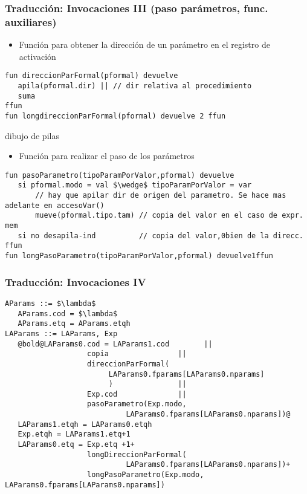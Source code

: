 \documentclass[hyperref={pdfpagelabels=false},tree-dvips,compress]{beamer}
\begin{document}
\begin{frame}[fragile]
\frametitle{Traducción: Invocaciones III (paso parámetros, func. auxiliares)}

\begin{itemize}
	\item Función para obtener la dirección de un parámetro en el registro de activación
\end{itemize}

\begin{lstlisting}[style=codigoMP,basicstyle=\scriptsize\ttfamily,mathescape]
fun direccionParFormal(pformal) devuelve
   apila(pformal.dir) || // dir relativa al procedimiento
   suma
ffun
fun longdireccionParFormal(pformal) devuelve 2 ffun
\end{lstlisting}

dibujo de pilas

\begin{itemize}
	\item Función para realizar el paso de los parámetros
\end{itemize}

\begin{lstlisting}[style=codigoMP,basicstyle=\scriptsize\ttfamily,mathescape]
fun pasoParametro(tipoParamPorValor,pformal) devuelve
   si pformal.modo = val $\wedge$ tipoParamPorValor = var
       // hay que apilar dir de origen del parametro. Se hace mas adelante en accesoVar()
       mueve(pformal.tipo.tam) // copia del valor en el caso de expr. mem
   si no desapila-ind          // copia del valor,0bien de la direcc.
ffun
fun longPasoParametro(tipoParamPorValor,pformal) devuelve1ffun
\end{lstlisting}

\end{frame}
\begin{frame}[fragile]
\frametitle{Traducción: Invocaciones IV}


\begin{lstlisting}[style=gramaticas,basicstyle=\scriptsize\ttfamily,mathescape]
AParams ::= $\lambda$
   AParams.cod = $\lambda$
   AParams.etq = AParams.etqh
LAParams ::= LAParams, Exp
   @bold@LAParams0.cod = LAParams1.cod        ||
                   copia                ||
                   direccionParFormal(
                   	    LAParams0.fparams[LAParams0.nparams]
                   	    )               ||
                   Exp.cod              ||
                   pasoParametro(Exp.modo,
                            LAParams0.fparams[LAParams0.nparams])@
   LAParams1.etqh = LAParams0.etqh
   Exp.etqh = LAParams1.etq+1
   LAParams0.etq = Exp.etq +1+
                   longDireccionParFormal(
                   	        LAParams0.fparams[LAParams0.nparams])+
                   longPasoParametro(Exp.modo, LAParams0.fparams[LAParams0.nparams])
\end{lstlisting}

\end{frame}
\end{document}
